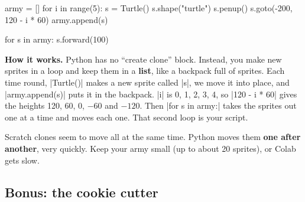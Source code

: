\begin{tcbraster}[raster columns=2, raster equal height=rows, raster column skip=12pt, raster valign=center, raster force size=false, raster column 1/.style={add to width=-2cm}, raster column 2/.style={add to width=2cm}]
\begin{tcolorbox}[colback=white, colframe=white, boxrule=0pt, valign=center]
\begin{scratch}
\end{scratch}
\par\smallskip
\begin{scratch}
\end{scratch}
\end{tcolorbox}
\begin{code}
army = []
for i in range(5):
    s = Turtle()
    s.shape("turtle")
    s.penup()
    s.goto(-200, 120 - i * 60)
    army.append(s)

for s in army:
    s.forward(100)
\end{code}
\end{tcbraster}

\textbf{How it works.} Python has no ``create clone'' block. Instead, you make new sprites in a loop and keep them in a \textbf{list}, like a backpack full of sprites. Each time round, \py|Turtle()| makes a new sprite called \py|s|, we move it into place, and \py|army.append(s)| puts it in the backpack. \py|i| is 0, 1, 2, 3, 4, so \py|120 - i * 60| gives the heights 120, 60, 0, $-60$ and $-120$. Then \py|for s in army:| takes the sprites out one at a time and moves each one. That second loop is your  script.

\begin{think}
Scratch clones seem to move all at the same time. Python moves them \textbf{one after another}, very quickly. Keep your army small (up to about 20 sprites), or Colab gets slow.
\end{think}

\subsection*{Bonus: the cookie cutter}

